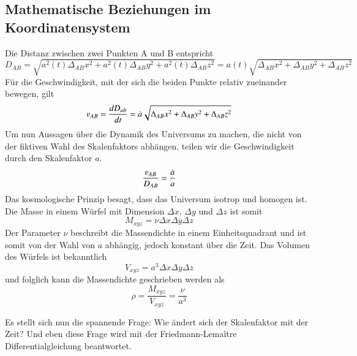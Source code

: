 \begin{refsection}
\subsection{Mathematische Beziehungen im Koordinatensystem}
Die Distanz zwischen zwei Punkten A und B entspricht 
\begin{equation}
D_{AB} = \sqrt{a^2(t)\Delta_{AB}x^2 + a^2(t)\Delta_{AB}y^2 + a^2(t)\Delta_{AB}z^2} = a(t) \sqrt{\Delta_{AB}x^2 + \Delta_{AB}y^2 + \Delta_{AB}z^2}
\end{equation}
F\"{u}r die Geschwindigkeit, mit der sich die beiden Punkte relativ zueinander bewegen, gilt 
\begin{equation}
\varv_{AB} = \dfrac{dD_{ab}}{dt} 
= \dot{a} \sqrt{\Delta_{AB}x^2 + \Delta_{AB}y^2 + \Delta_{AB}z^2}
\end{equation}
Um nun Aussagen über die Dynamik des Universums zu machen, die nicht von der fiktiven Wahl  des Skalenfaktors abhängen, teilen wir die Geschwindigkeit durch den Skalenfaktor $a$.
\begin{equation}
\frac{\varv_{AB} }{D_{AB}} = \frac{\dot{a}}{a}
\label{friedmann:geschwindigkeit}
\end{equation}
Das kosmologische Prinzip besagt, dass das Universum isotrop und homogen ist. Die Masse in einem Würfel mit Dimension $\Delta x$, $\Delta y$ und $\Delta z$ ist somit
\begin{equation}
M_{xyz} = \nu \Delta x \Delta y \Delta z
\end{equation}
Der Parameter $\nu$ beschreibt die Massendichte in einem Einheitsquadrant und ist somit von der Wahl von $a$ abhängig, jedoch konstant über die Zeit. Das Volumen des Würfels ist bekanntlich 
\begin{equation}
V_{xyz} = a^3 \Delta x \Delta y \Delta z
\end{equation}
und folglich kann die Massendichte geschrieben werden als
\begin{equation}
\rho = \frac{M_{xyz}}{V_{xyz}} = \frac{\nu}{a^3}
\label{friedmann:dichte}
\end{equation}

Es stellt sich nun die spannende Frage: Wie ändert sich der Skalenfaktor mit der Zeit? Und eben diese Frage wird mit der Friedmann-Lema\^{i}tre Differentialgleichung beantwortet.



\end{refsection}
